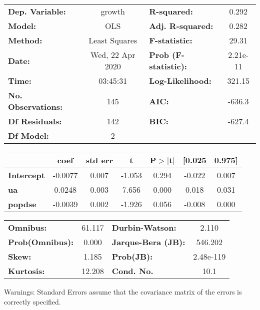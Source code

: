 \begin{center}
\begin{tabular}{lclc}
\toprule
\textbf{Dep. Variable:}    &      growth      & \textbf{  R-squared:         } &     0.292   \\
\textbf{Model:}            &       OLS        & \textbf{  Adj. R-squared:    } &     0.282   \\
\textbf{Method:}           &  Least Squares   & \textbf{  F-statistic:       } &     29.31   \\
\textbf{Date:}             & Wed, 22 Apr 2020 & \textbf{  Prob (F-statistic):} &  2.21e-11   \\
\textbf{Time:}             &     03:45:31     & \textbf{  Log-Likelihood:    } &    321.15   \\
\textbf{No. Observations:} &         145      & \textbf{  AIC:               } &    -636.3   \\
\textbf{Df Residuals:}     &         142      & \textbf{  BIC:               } &    -627.4   \\
\textbf{Df Model:}         &           2      & \textbf{                     } &             \\
\bottomrule
\end{tabular}
\begin{tabular}{lcccccc}
                   & \textbf{coef} & \textbf{std err} & \textbf{t} & \textbf{P$> |$t$|$} & \textbf{[0.025} & \textbf{0.975]}  \\
\midrule
\textbf{Intercept} &      -0.0077  &        0.007     &    -1.053  &         0.294        &       -0.022    &        0.007     \\
\textbf{ua}        &       0.0248  &        0.003     &     7.656  &         0.000        &        0.018    &        0.031     \\
\textbf{popdse}    &      -0.0039  &        0.002     &    -1.926  &         0.056        &       -0.008    &        0.000     \\
\bottomrule
\end{tabular}
\begin{tabular}{lclc}
\textbf{Omnibus:}       & 61.117 & \textbf{  Durbin-Watson:     } &     2.110  \\
\textbf{Prob(Omnibus):} &  0.000 & \textbf{  Jarque-Bera (JB):  } &   546.202  \\
\textbf{Skew:}          &  1.185 & \textbf{  Prob(JB):          } & 2.48e-119  \\
\textbf{Kurtosis:}      & 12.208 & \textbf{  Cond. No.          } &      10.1  \\
\bottomrule
\end{tabular}
\end{center}

Warnings: \newline
 [1] Standard Errors assume that the covariance matrix of the errors is correctly specified.